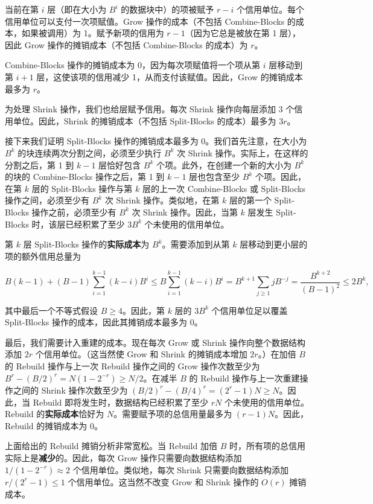 \documentclass[12pt,a4paper]{ctexart}
\theoremstyle{remark}
\begin{document}
当前在第 $i$ 层（即在大小为 $B^i$ 的数据块中）的项被赋予 $r-i$ 个信用单位。每个信用单位可以支付一次项赋值。Grow 操作的成本（不包括 Combine-Blocks 的成本，如果被调用）为 1。赋予新项的信用为 $r-1$（因为它总是被放在第 1 层），因此 Grow 操作的摊销成本（不包括 Combine-Blocks 的成本）为 $r$。

Combine-Blocks 操作的摊销成本为 0，因为每次项赋值将一个项从第 $i$ 层移动到第 $i+1$ 层，这使该项的信用减少 1，从而支付该赋值。因此，Grow 的摊销成本最多为 $r$。

为处理 Shrink 操作，我们也给层赋予信用。每次 Shrink 操作向每层添加 3 个信用单位。因此，Shrink 的摊销成本（不包括 Split-Blocks 的成本）最多为 $3r$。

接下来我们证明 Split-Blocks 操作的摊销成本最多为 0。我们首先注意，在大小为 $B^k$ 的块连续两次分割之间，必须至少执行 $B^k$ 次 Shrink 操作。实际上，在这样的分割之后，第 1 到 $k-1$ 层恰好包含 $B^k$ 个项。此外，在创建一个新的大小为 $B^k$ 的块的 Combine-Blocks 操作之后，第 1 到 $k-1$ 层也包含至少 $B^k$ 个项。因此，在第 $k$ 层的 Split-Blocks 操作与第 $k$ 层的上一次 Combine-Blocks 或 Split-Blocks 操作之间，必须至少有 $B^k$ 次 Shrink 操作。类似地，在第 $k$ 层的第一个 Split-Blocks 操作之前，必须至少有 $B^k$ 次 Shrink 操作。因此，当第 $k$ 层发生 Split-Blocks 时，该层已经积累了至少 $3B^k$ 个未使用的信用单位。

第 $k$ 层 Split-Blocks 操作的\textbf{实际成本}为 $B^k$。需要添加到从第 $k$ 层移动到更小层的项的额外信用总量为

$$B(k-1)+(B-1)\sum_{i=1}^{k-1}(k-i)B^i \leq B\sum_{i=1}^{k-1}(k-i)B^i = B^{k+1}\sum_{j\geq 1} jB^{-j} = \frac{B^{k+2}}{(B-1)^2} \leq 2B^k,$$

其中最后一个不等式假设 $B\geq 4$。因此，第 $k$ 层的 $3B^k$ 个信用单位足以覆盖 Split-Blocks 操作的成本，因此其摊销成本最多为 0。

最后，我们需要计入重建的成本。现在每次 Grow 或 Shrink 操作向整个数据结构添加 $2r$ 个信用单位。（这当然使 Grow 和 Shrink 的摊销成本增加 $2r$。）在加倍 $B$ 的 Rebuild 操作与上一次 Rebuild 操作之间的 Grow 操作次数至少为 $B^r-(B/2)^r=N(1-2^{-r})\geq N/2$。在减半 $B$ 的 Rebuild 操作与上一次重建操作之间的 Shrink 操作次数至少为 $(B/2)^r-(B/4)^r=(2^r-1)N\geq N$。因此，当 Rebuild 即将发生时，数据结构已经积累了至少 $rN$ 个未使用的信用单位。Rebuild 的\textbf{实际成本}恰好为 $N$。需要赋予项的总信用量最多为 $(r-1)N$。因此，Rebuild 的摊销成本为 0。

上面给出的 Rebuild 摊销分析非常宽松。当 Rebuild 加倍 $B$ 时，所有项的总信用实际上是\textbf{减少}的。因此，每次 Grow 操作只需要向数据结构添加 $1/(1-2^{-r})\approx 2$ 个信用单位。类似地，每次 Shrink 只需要向数据结构添加 $r/(2^r-1)\leq 1$ 个信用单位。这当然不改变 Grow 和 Shrink 操作的 $O(r)$ 摊销成本。
\end{document}
